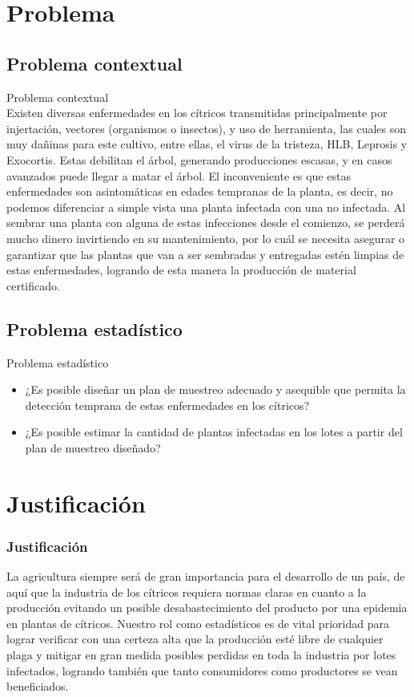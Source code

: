 \documentclass[10pt]{beamer}
\begin{document}
\section{Problema}
\begin{frame}
\subsection{Problema contextual}
\begin{block}{Problema contextual}
\justifying
~\\Existen diversas enfermedades en los cítricos transmitidas principalmente por injertación, vectores (organismos o insectos), y uso de herramienta, las cuales son muy dañinas para este cultivo, entre ellas, el virus de la tristeza, HLB, Leprosis y Exocortis. Estas debilitan el árbol, generando producciones escasas, y en casos avanzados puede llegar a matar el árbol. El inconveniente es que estas enfermedades son asintomáticas en edades tempranas de la planta, es decir, no podemos diferenciar a simple vista una planta infectada con una no infectada. Al sembrar una planta con alguna de estas infecciones desde el comienzo, se perderá mucho dinero invirtiendo en su mantenimiento, por lo cuál se necesita asegurar o garantizar que las plantas que van a ser sembradas y entregadas estén limpias de estas enfermedades, logrando de esta manera la producción de material certificado.
\end{block}
\subsection{Problema estadístico}
\begin{block}{Problema estadístico}
\begin{itemize}
\justifying
\item ¿Es posible diseñar un plan de muestreo adecuado y asequible que permita la detección temprana de estas enfermedades en los cítricos?
\item ¿Es posible estimar la cantidad de plantas infectadas en los lotes a partir del plan de muestreo diseñado?
\end{itemize}
\end{block}
\end{frame}


\section{Justificación}
\begin{frame}
\frametitle{Justificación}
\justifying
La agricultura siempre será de gran importancia para el desarrollo de un país, de aquí que la industria de los cítricos requiera normas claras en cuanto a la producción evitando un posible desabastecimiento del producto por una epidemia en plantas de cítricos. Nuestro rol como estadísticos es de vital prioridad para lograr verificar con una certeza alta que la producción esté libre de cualquier plaga y mitigar en gran medida posibles perdidas en toda la industria por lotes infectados, logrando también que tanto consumidores como productores se vean beneficiados.
\end{frame}
\end{document}

